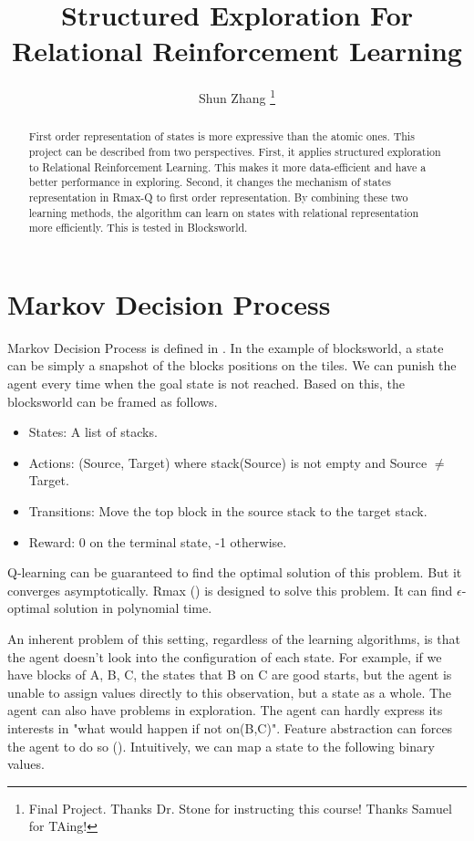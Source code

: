 \documentclass[10pt]{article}
\title{Structured Exploration For Relational Reinforcement Learning}
\author{Shun Zhang \thanks{Final Project. Thanks Dr. Stone for instructing this
course! Thanks Samuel for TAing!}}
\date{}
\begin{document}
\maketitle

\begin{abstract}
First order representation of states is more expressive than the atomic ones.
This project can be described from two perspectives. First, it applies
structured exploration to Relational Reinforcement Learning. This makes it more
data-efficient and have a better performance in exploring. Second, it changes
the mechanism of states representation in Rmax-Q to first order representation.
By combining these two learning methods, the algorithm can learn on states with
relational representation more efficiently. This is tested in Blocksworld.
\end{abstract}

\sloppy
\section{Markov Decision Process}

Markov Decision Process is defined in \cite{sutton98a}.  In the example of
blocksworld, a state can be simply a snapshot of the blocks positions on the
tiles.  We can punish the agent every time when the goal state is not reached.
Based on this, the blocksworld can be framed as follows.

\begin{itemize}

\item States: A list of stacks.

\item Actions: (Source, Target) where stack(Source) is not empty and Source
$\neq$ Target.

\item Transitions: Move the top block in the source stack to the target stack.

\item Reward: 0 on the terminal state, -1 otherwise.

\end{itemize}

Q-learning can be guaranteed to find the optimal solution of this problem. But
it converges asymptotically. Rmax (\cite{Brafman:2003}) is designed to solve
this problem.  It can find $\epsilon$-optimal solution in polynomial time.

An inherent problem of this setting, regardless of the learning algorithms, is
that the agent doesn't look into the configuration of each state. For example,
if we have blocks of A, B, C, the states that B on C are good starts, but the
agent is unable to assign values directly to this observation, but a state as a
whole. The agent can also have problems in exploration. The agent can hardly
express its interests in "what would happen if not on(B,C)". Feature abstraction
can forces the agent to do so (\cite{sutton98a}). Intuitively, we can map a
state to the following binary values.
\end{document}
